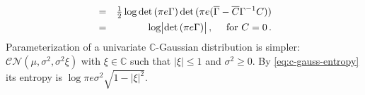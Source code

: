 \documentclass{article}
\newcommand{\cplx}{\mathbb{C}}
\newcommand{\conj}[1]{\overline{#1}}
\begin{document}
\begin{eqnarray}
    &=&
      \tfrac12 \log \det{(\pi e \Gamma)}
      \det{(\pi e (\conj{\Gamma} - \conj{C} \Gamma^{-1} C))}
    \notag \\
    &=&
      \log \bigl\lvert \det{(\pi e \Gamma)} \bigr\rvert
      \,, \quad \text{ for } C = 0
    \,.
    \notag
\end{eqnarray}
%
Parameterization of a univariate $\cplx$-Gaussian distribution is simpler: $
  \mathcal{CN}(\mu, \sigma^2, \sigma^2 \xi)
$ with $\xi \in \cplx$ such that $\lvert \xi \rvert \leq 1$ and $\sigma^2 \geq 0$.
By \eqref{eq:c-gauss-entropy} its entropy is $
  \log \pi e \sigma^2 \sqrt{1 - \lvert \xi \rvert^2}
$.
\end{document}
